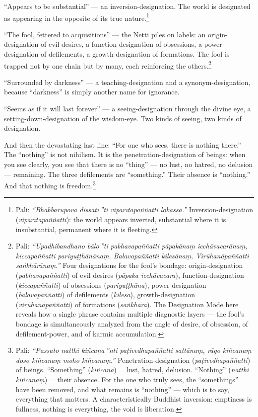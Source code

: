 ``Appears to be substantial'' --- an inversion-designation. The world is designated as appearing in the opposite of its true nature.\footnote{Pali: \textit{``Bhabbarūpova dissatī\,''ti viparītapaññatti lokassa.''} Inversion-designation (\textit{viparītapaññatti}): the world appears inverted, substantial where it is insubstantial, permanent where it is fleeting.}

``The fool, fettered to acquisitions'' --- the Netti piles on labels: an origin-designation of evil desires, a function-designation of obsessions, a power-designation of defilements, a growth-designation of formations. The fool is trapped not by one chain but by many, each reinforcing the others.\footnote{Pali: \textit{``Upadhibandhano bālo\,''ti pabhavapaññatti pāpakānaṃ icchāvacarānaṃ, kiccapaññatti pariyuṭṭhānānaṃ. Balavapaññatti kilesānaṃ. Virūhanāpaññatti saṅkhārānaṃ.''} Four designations for the fool's bondage: origin-designation (\textit{pabhavapaññatti}) of evil desires (\textit{pāpaka icchāvacara}), function-designation (\textit{kiccapaññatti}) of obsessions (\textit{pariyuṭṭhāna}), power-designation (\textit{balavapaññatti}) of defilements (\textit{kilesa}), growth-designation (\textit{virūhanāpaññatti}) of formations (\textit{saṅkhāra}). The Designation Mode here reveals how a single phrase contains multiple diagnostic layers --- the fool's bondage is simultaneously analyzed from the angle of desire, of obsession, of defilement-power, and of karmic accumulation.}

``Surrounded by darkness'' --- a teaching-designation and a synonym-designation, because ``darkness'' is simply another name for ignorance.

``Seems as if it will last forever'' --- a seeing-designation through the divine eye, a setting-down-designation of the wisdom-eye. Two kinds of seeing, two kinds of designation.

And then the devastating last line: ``For one who sees, there is nothing there.'' The ``nothing'' is not nihilism. It is the penetration-designation of beings: when you see clearly, you see that there is no ``thing'' --- no lust, no hatred, no delusion --- remaining. The three defilements are ``something.'' Their absence is ``nothing.'' And that nothing is freedom.\footnote{Pali: \textit{``Passato natthi kiñcana\,''nti paṭivedhapaññatti sattānaṃ, rāgo kiñcanaṃ doso kiñcanaṃ moho kiñcanaṃ.''} Penetration-designation (\textit{paṭivedhapaññatti}) of beings. ``Something'' (\textit{kiñcana}) = lust, hatred, delusion. ``Nothing'' (\textit{natthi kiñcanaṃ}) = their absence. For the one who truly sees, the ``somethings'' have been removed, and what remains is ``nothing'' --- which is to say, everything that matters. A characteristically Buddhist inversion: emptiness is fullness, nothing is everything, the void is liberation.}

